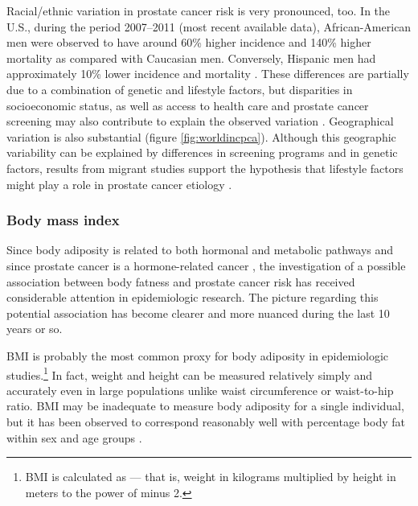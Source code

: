 Racial/ethnic variation in prostate cancer risk is very pronounced, too. In the U.S., during the period 2007--2011 (most recent available data), African-American men were observed to have around 60\% higher incidence and 140\% higher mortality as compared with Caucasian men. Conversely, Hispanic men had approximately 10\% lower incidence and  mortality \citep{acs_cancer_2015}. These differences are partially due to a combination of genetic and lifestyle factors, but disparities in socioeconomic status, as well as access to health care and prostate cancer screening may also contribute to explain the observed variation \citep{jones_explaining_2008}. Geographical variation is also substantial (figure \ref{fig:worldincpca}). Although this geographic variability can be explained by differences in screening programs and in genetic factors, results from migrant studies support the hypothesis that lifestyle factors might play a role in prostate cancer etiology \citep{wilson_lifestyle_2012}.


\subsubsection{Body mass index}

Since body adiposity is related to both hormonal and metabolic pathways and since prostate cancer is a hormone-related cancer \citep{hsing_obesity_2007}, the investigation of a possible association between body fatness and prostate cancer risk has received considerable attention in epidemiologic research. The picture regarding this potential association has become clearer and more nuanced during the last 10 years or so.

BMI is probably the most common proxy for body adiposity in epidemiologic studies.\footnote{BMI is calculated as \kgmsq{} --- that is, weight in kilograms multiplied by height in meters to the power of minus 2.} In fact, weight and height can be measured relatively simply and accurately even in large populations unlike waist circumference or waist-to-hip ratio. BMI may be inadequate to measure body adiposity for a single individual, but it has been observed to correspond reasonably well with percentage body fat within sex and age groups \citep{flegal_comparisons_2009}.
 
